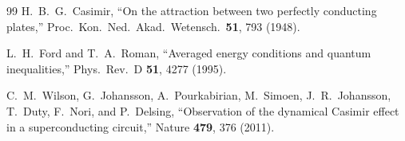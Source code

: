 \documentclass[twocolumn,floatfix,aps,prd,nofootinbib]{revtex4-2}
\begin{document}
\begin{thebibliography}{99}
H.~B.~G.~Casimir,
\newblock ``On the attraction between two perfectly conducting plates,''
\newblock Proc.\ Kon.\ Ned.\ Akad.\ Wetensch.\ \textbf{51}, 793 (1948).

L.~H.~Ford and T.~A.~Roman,
\newblock ``Averaged energy conditions and quantum inequalities,''
\newblock Phys.\ Rev.\ D \textbf{51}, 4277 (1995).

C.~M.~Wilson, G.~Johansson, A.~Pourkabirian, M.~Simoen, J.~R.~Johansson,
T.~Duty, F.~Nori, and P.~Delsing,
\newblock ``Observation of the dynamical Casimir effect in a superconducting
circuit,''
\newblock Nature \textbf{479}, 376 (2011).

\end{thebibliography}
\end{document}
